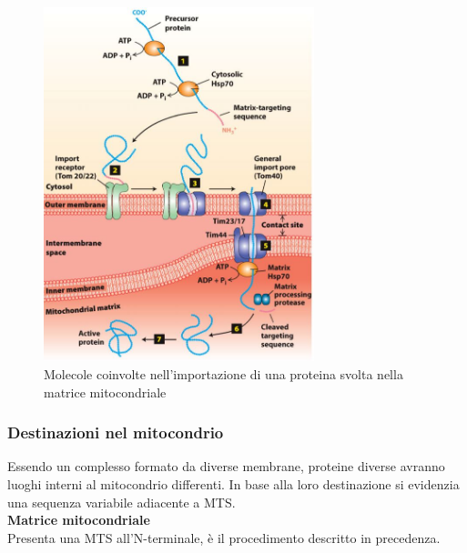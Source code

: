         \begin{figure}[h]
            \centering
            \includegraphics[width=0.7\textwidth]{images/importMito.JPG}
            \caption{\small Molecole coinvolte nell'importazione di una proteina svolta nella matrice mitocondriale}
            \label{fig:mesh1}
        \end{figure}
        
        \subsubsection{Destinazioni nel mitocondrio}
            Essendo un complesso formato da diverse membrane, proteine diverse avranno luoghi interni al mitocondrio differenti. In base alla loro destinazione si evidenzia una sequenza variabile adiacente a MTS.\\
            
            \textbf{Matrice mitocondriale}\\
                Presenta una MTS all'N-terminale, è il procedimento descritto in precedenza.\\
                
